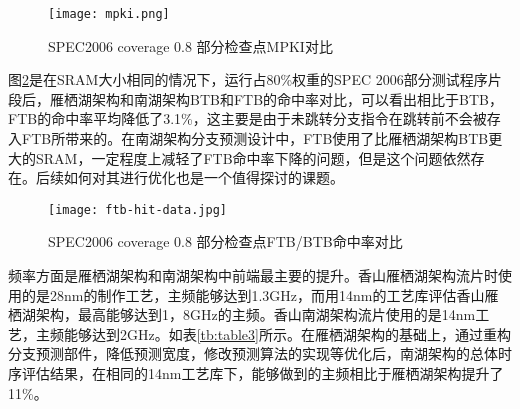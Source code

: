 \begin{figure}[htb]
	\centering
	\setlength\tabcolsep{3pt}  %
	\vspace{5pt} %
	\texttt{[image: mpki.png]}
	\caption{SPEC2006 coverage 0.8 部分检查点MPKI对比}
	\label{fig:figure62}
\end{figure}

图\ref{fig:figure63}是在SRAM大小相同的情况下，运行占80\%权重的SPEC 2006部分测试程序片段后，雁栖湖架构和南湖架构BTB和FTB的命中率对比，可以看出相比于BTB，FTB的命中率平均降低了3.1\%，这主要是由于未跳转分支指令在跳转前不会被存入FTB所带来的。在南湖架构分支预测设计中，FTB使用了比雁栖湖架构BTB更大的SRAM，一定程度上减轻了FTB命中率下降的问题，但是这个问题依然存在。后续如何对其进行优化也是一个值得探讨的课题。



\begin{figure}[H]
	\centering
	\setlength\tabcolsep{3pt}  %
	\vspace{5pt} %
	\texttt{[image: ftb-hit-data.jpg]}
	\caption{SPEC2006 coverage 0.8 部分检查点FTB/BTB命中率对比}
	\label{fig:figure63}
\end{figure}


频率方面是雁栖湖架构和南湖架构中前端最主要的提升。香山雁栖湖架构流片时使用的是28nm的制作工艺，主频能够达到1.3GHz，而用14nm的工艺库评估香山雁栖湖架构，最高能够达到1，8GHz的主频。香山南湖架构流片使用的是14nm工艺，主频能够达到2GHz。如表\ref{tb:table3}所示。在雁栖湖架构的基础上，通过重构分支预测部件，降低预测宽度，修改预测算法的实现等优化后，南湖架构的总体时序评估结果，在相同的14nm工艺库下，能够做到的主频相比于雁栖湖架构提升了11\%。

